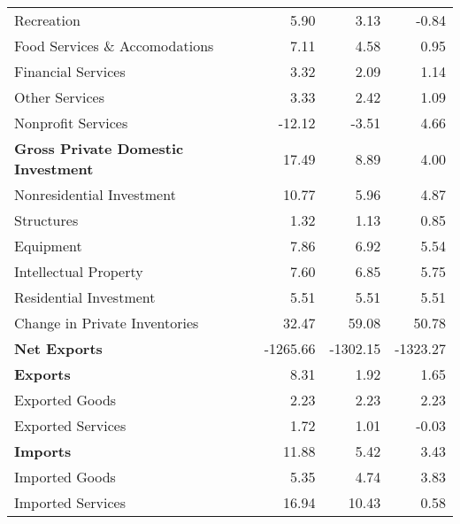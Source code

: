 \documentclass[11pt, letterpaper]{article}\usepackage[]{graphicx}\usepackage[]{color}
\begin{document}
\begin{table}[H]
\begin{tabular}{lrrr}
  \hspace{16mm}  Recreation & 5.90 & 3.13 & -0.84 \\ 
  \hspace{16mm}  Food Services \& Accomodations & 7.11 & 4.58 & 0.95 \\ 
  \hspace{16mm}  Financial Services & 3.32 & 2.09 & 1.14 \\ 
  \hspace{16mm}  Other Services & 3.33 & 2.42 & 1.09 \\ 
  \hspace{16mm}  Nonprofit Services & -12.12 & -3.51 & 4.66 \\ 
  \hspace{0mm} \textbf{Gross Private Domestic Investment} & 17.49 & 8.89 & 4.00 \\ 
  \hspace{8mm}  Nonresidential Investment & 10.77 & 5.96 & 4.87 \\ 
  \hspace{16mm}  Structures & 1.32 & 1.13 & 0.85 \\ 
  \hspace{16mm}  Equipment & 7.86 & 6.92 & 5.54 \\ 
  \hspace{16mm}  Intellectual Property & 7.60 & 6.85 & 5.75 \\ 
  \hspace{8mm}  Residential Investment & 5.51 & 5.51 & 5.51 \\ 
  \hspace{8mm}  Change in Private Inventories & 32.47 & 59.08 & 50.78 \\ 
  \hspace{0mm} \textbf{Net Exports} & -1265.66 & -1302.15 & -1323.27 \\ 
  \hspace{0mm} \textbf{Exports} & 8.31 & 1.92 & 1.65 \\ 
  \hspace{8mm}  Exported Goods & 2.23 & 2.23 & 2.23 \\ 
  \hspace{8mm}  Exported Services & 1.72 & 1.01 & -0.03 \\ 
  \hspace{0mm} \textbf{Imports} & 11.88 & 5.42 & 3.43 \\ 
  \hspace{8mm}  Imported Goods & 5.35 & 4.74 & 3.83 \\ 
  \hspace{8mm}  Imported Services & 16.94 & 10.43 & 0.58 \\ 

\end{tabular}
\end{table}
\end{document}

